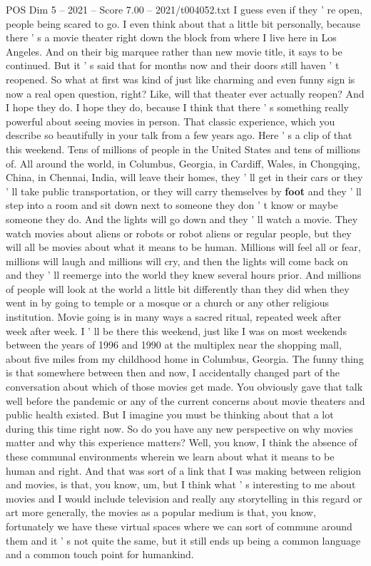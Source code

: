 \begin{textsample}{POS Dim 5 – 2021 – Score 7.00 – 2021/t004052.txt}
I guess even if they ' re open, people being scared to go.
I even think about that a little bit personally, because there ' s a movie theater right down the block from where I live here in Los Angeles.
And on their big marquee rather than new movie title, it says to be continued.
But it ' s said that for months now and their doors still haven ' t reopened.
So what at first was kind of just like charming and even funny sign is now a real open question, right?
Like, will that theater ever actually reopen?
And I hope they do.
I hope they do, because I think that there ' s something really powerful about seeing movies in person.
That classic experience, which you describe so beautifully in your talk from a few years ago.
Here ' s a clip of that this weekend.
Tens of millions of people in the United States and tens of millions of.
All around the world, in Columbus, Georgia, in Cardiff, Wales, in Chongqing, China, in Chennai, India, will leave their homes, they ' ll get in their cars or they ' ll take public transportation, or they will carry themselves by \textbf{foot} and they ' ll step into a room and sit down next to someone they don ' t know or maybe someone they do.
And the lights will go down and they ' ll watch a movie.
They watch movies about aliens or robots or robot aliens or regular people, but they will all be movies about what it means to be human.
Millions will feel all or fear, millions will laugh and millions will cry, and then the lights will come back on and they ' ll reemerge into the world they knew several hours prior.
And millions of people will look at the world a little bit differently than they did when they went in by going to temple or a mosque or a church or any other religious institution.
Movie going is in many ways a sacred ritual, repeated week after week after week.
I ' ll be there this weekend, just like I was on most weekends between the years of 1996 and 1990 at the multiplex near the shopping mall, about five miles from my childhood home in Columbus, Georgia.
The funny thing is that somewhere between then and now, I accidentally changed part of the conversation about which of those movies get made.
You obviously gave that talk well before the pandemic or any of the current concerns about movie theaters and public health existed.
But I imagine you must be thinking about that a lot during this time right now.
So do you have any new perspective on why movies matter and why this experience matters?
Well, you know, I think the absence of these communal environments wherein we learn about what it means to be human and right.
And that was sort of a link that I was making between religion and movies, is that, you know, um, but I think what ' s interesting to me about movies and I would include television and really any storytelling in this regard or art more generally, the movies as a popular medium is that, you know, fortunately we have these virtual spaces where we can sort of commune around them and it ' s not quite the same, but it still ends up being a common language and a common touch point for humankind.

\end{textsample}
